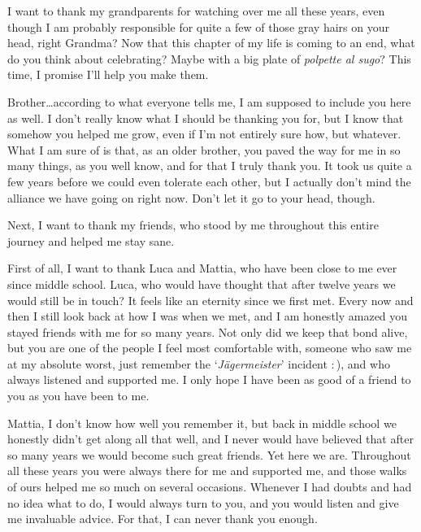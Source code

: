 \documentclass[english, oneside]{sapthesis}
\begin{document}
\begin{acknowledgments}
\medskip

I want to thank my grandparents for watching over me all these years, even though I am probably responsible for quite a few of those gray hairs on your head, right Grandma? Now that this chapter of my life is coming to an end, what do you think about celebrating? Maybe with a big plate of \textit{polpette al sugo}? This time, I promise I'll help you make them.

\medskip

Brother\ldots according to what everyone tells me, I am supposed to include you here as well. I don't really know what I should be thanking you for, but I know that somehow you helped me grow, even if I'm not entirely sure how, but whatever. What I am sure of is that, as an older brother, you paved the way for me in so many things, as you well know, and for that I truly thank you. It took us quite a few years before we could even tolerate each other, but I actually don't mind the alliance we have going on right now. Don't let it go to your head, though.

\medskip

Next, I want to thank my friends, who stood by me throughout this entire journey and helped me stay sane.

\medskip

First of all, I want to thank Luca and Mattia, who have been close to me ever since middle school.
\enlargethispage{2\baselineskip}
Luca, who would have thought that after twelve years we would still be in touch? It feels like an eternity since we first met. Every now and then I still look back at how I was when we met, and I am honestly amazed you stayed friends with me for so many years. Not only did we keep that bond alive, but you are one of the people I feel most comfortable with, someone who saw me at my absolute worst, just remember the `\textit{J\"agermeister}' incident \mbox{:\,)}, and who always listened and supported me. I only hope I have been as good of a friend to you as you have been to me.

Mattia, I don't know how well you remember it, but back in middle school we honestly didn't get along all that well, and I never would have believed that after so many years we would become such great friends. Yet here we are. Throughout all these years you were always there for me and supported me, and those walks of ours helped me so much on several occasions. Whenever I had doubts and had no idea what to do, I would always turn to you, and you would listen and give me invaluable advice. For that, I can never thank you enough.


\end{acknowledgments}
\end{document}

